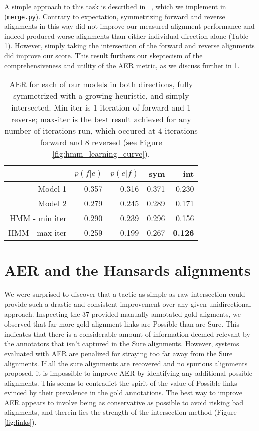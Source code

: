\documentclass{article}
\begin{document}
A simple approach to this task is described in ~\cite{koehn}, which we implement in ({\tt merge.py}).
Contrary to expectation, symmetrizing forward and reverse alignments in this way did not improve our measured alignment performance and indeed produced worse alignments than either individual direction alone (Table \ref{tab:summary}).
However, simply taking the intersection of the forward and reverse alignments did improve our score. This result furthers our skeptecism of the comprehensiveness and utility of the AER metric, as we discuss further in \ref{aer}.
\begin{table}[h]
\begin{center}
\begin{tabular}{r|rrrr}
    & $p(f|e)$ & $p(e|f)$ & sym & int\\ \hline
    Model 1 &0.357 & 0.316&0.371 & 0.230\\
    Model 2 &0.279& 0.245& 0.289& 0.171\\
    HMM - min iter &0.290 & 0.239& 0.296& 0.156\\
    HMM - max iter &0.259 &0.199 & 0.267& {\bf 0.126}\\
\end{tabular}
\end{center}
\caption{AER for each of our models in both directions, fully symmetrized with a growing heuristic, and simply intersected. Min-iter is 1 iteration of forward and 1 reverse; max-iter is the best result achieved for any number of iterations run, which occured at 4 iterations forward and 8 reversed (see Figure \ref{fig:hmm_learning_curve}).}
\label{tab:summary}
\end{table}



\section{AER and the Hansards alignments}
\label{aer}

We were surprised to discover that a tactic as simple as raw intersection could provide such a drastic and consistent improvement over any given unidirectional approach.
Inspecting the 37 provided manually annotated gold aligments, we observed that far more gold alignment links are Possible than are Sure. This indicates that there is a considerable amount of information deemed relevant by the annotators that isn't captured in the Sure alignments. However, systems evaluated with AER are penalized for straying too far away from the Sure alignments. If all the sure alignments are recovered and no spurious alignments proposed, it is impossible to improve AER by identifying any additional possible alignments. This seems to contradict the spirit of the value of Possible links evinced by their prevalence in the gold annotations.
The best way to improve AER appears to involve being as conservative as possible to avoid risking bad alignments, and therein lies the strength of the intersection method (Figure \ref{fig:links}).
\end{document}
